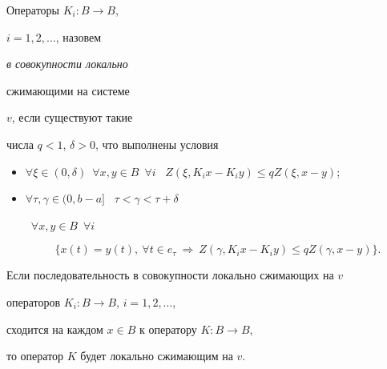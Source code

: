Операторы $K_{i}:B \to B$,


$i=1, 2,\dotsc$, назовем {\it в совокупности локально


сжимающими на системе} $v$, если существуют такие


числа $q<1$, $\delta>0$, что выполнены условия


\begin{itemize}


\item[1)] $\forall \xi\in(0, \delta)$\, $\forall x, y\in


B$\, $\forall i$ \ $Z(\xi,K_i x-K_i y) \leqslant q Z(\xi, x- y)$;


\item[2)] $\forall \tau,\gamma\in


(0, b-a]$ \ $\tau<\gamma<\tau+\delta$


\ $\forall x, y\in B$\, $\forall i$


$$


\{x(t)=y(t), \ \forall t\in e_\tau


\ \Rightarrow \ Z(\gamma,K_i x-K_i y) \leqslant q Z(\gamma, x- y) \}.


$$


\end{itemize}





Если последовательность в совокупности локально сжимающих на $v$


операторов $K_{i}:B \to B$, $i=1, 2, \dotsc$,


сходится на каждом $x\in B$ к оператору $K:B \to B$,


то оператор $K$ будет локально сжимающим на $v$.








